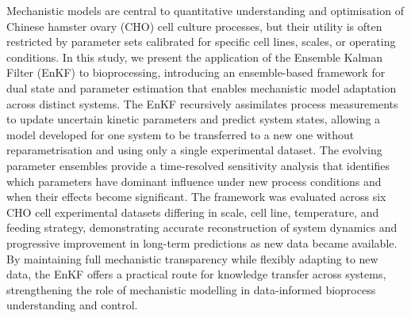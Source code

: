 Mechanistic models are central to quantitative understanding and optimisation of Chinese hamster ovary (CHO) cell culture processes, but their utility is often restricted by parameter sets calibrated for specific cell lines, scales, or operating conditions. In this study, we present the application of the Ensemble Kalman Filter (EnKF) to bioprocessing, introducing an  ensemble-based framework for dual state and parameter estimation that enables mechanistic model adaptation across distinct systems. The EnKF recursively assimilates process measurements to update uncertain kinetic parameters and predict system states, allowing a model developed for one system to be transferred to a new one without reparametrisation and using only a single experimental dataset. The evolving parameter ensembles provide a time-resolved sensitivity analysis that identifies which parameters have dominant influence under new process conditions and when their effects become significant. The framework was evaluated across six CHO cell experimental datasets differing in scale, cell line, temperature, and feeding strategy, demonstrating accurate reconstruction of system dynamics and progressive improvement in long-term predictions as new data became available. By maintaining full mechanistic transparency while flexibly adapting to new data, the EnKF offers a practical route for knowledge transfer across systems, strengthening the role of mechanistic modelling in data-informed bioprocess understanding and control.